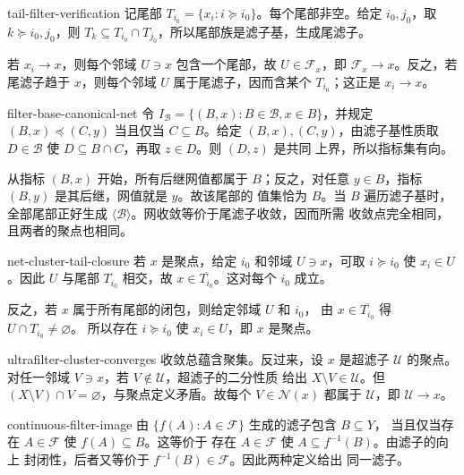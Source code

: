 \begin{solution}{tail-filter-verification}
记尾部 \(T_{i_0}=\{x_i:i\succcurlyeq i_0\}\)。每个尾部非空。给定
\(i_0,j_0\)，取 \(k\succcurlyeq i_0,j_0\)，则
\(T_k\subseteq T_{i_0}\cap T_{j_0}\)，所以尾部族是滤子基，生成尾滤子。

若 \(x_i\to x\)，则每个邻域 \(U\ni x\) 包含一个尾部，故
\(U\in\mathcal F_x\)，即 \(\mathcal F_x\to x\)。反之，若尾滤子趋于
\(x\)，则每个邻域 \(U\) 属于尾滤子，因而含某个 \(T_{i_0}\)；这正是
\(x_i\to x\)。
\end{solution}

\begin{solution}{filter-base-canonical-net}
令 \(I_{\mathcal B}=\{(B,x):B\in\mathcal B,x\in B\}\)，并规定
\((B,x)\preccurlyeq(C,y)\) 当且仅当 \(C\subseteq B\)。给定
\((B,x),(C,y)\)，由滤子基性质取 \(D\in\mathcal B\) 使
\(D\subseteq B\cap C\)，再取 \(z\in D\)。则 \((D,z)\) 是共同
上界，所以指标集有向。

从指标 \((B,x)\) 开始，所有后继网值都属于 \(B\)；反之，对任意
\(y\in B\)，指标 \((B,y)\) 是其后继，网值就是 \(y\)。故该尾部的
值集恰为 \(B\)。当 \(B\) 遍历滤子基时，全部尾部正好生成
\(\langle\mathcal B\rangle\)。网收敛等价于尾滤子收敛，因而所需
收敛点完全相同，且两者的聚点也相同。
\end{solution}

\begin{solution}{net-cluster-tail-closure}
若 \(x\) 是聚点，给定 \(i_0\) 和邻域 \(U\ni x\)，可取
\(i\succcurlyeq i_0\) 使 \(x_i\in U\)。因此 \(U\) 与尾部
\(T_{i_0}\) 相交，故 \(x\in\overline{T_{i_0}}\)。这对每个
\(i_0\) 成立。

反之，若 \(x\) 属于所有尾部的闭包，则给定邻域 \(U\) 和 \(i_0\)，
由 \(x\in\overline{T_{i_0}}\) 得 \(U\cap T_{i_0}\ne\varnothing\)。
所以存在 \(i\succcurlyeq i_0\) 使 \(x_i\in U\)，即 \(x\) 是聚点。
\end{solution}

\begin{solution}{ultrafilter-cluster-converges}
收敛总蕴含聚集。反过来，设 \(x\) 是超滤子 \(\mathcal U\) 的聚点。
对任一邻域 \(V\ni x\)，若 \(V\notin\mathcal U\)，超滤子的二分性质
给出 \(X\setminus V\in\mathcal U\)。但
\((X\setminus V)\cap V=\varnothing\)，与聚点定义矛盾。故每个
\(V\in\mathcal N(x)\) 都属于 \(\mathcal U\)，即
\(\mathcal U\to x\)。
\end{solution}

\begin{solution}{continuous-filter-image}
由 \(\{f(A):A\in\mathcal F\}\) 生成的滤子包含 \(B\subseteq Y\)，
当且仅当存在 \(A\in\mathcal F\) 使 \(f(A)\subseteq B\)。这等价于
存在 \(A\in\mathcal F\) 使 \(A\subseteq f^{-1}(B)\)。由滤子的向上
封闭性，后者又等价于 \(f^{-1}(B)\in\mathcal F\)。因此两种定义给出
同一滤子。
\end{solution}

